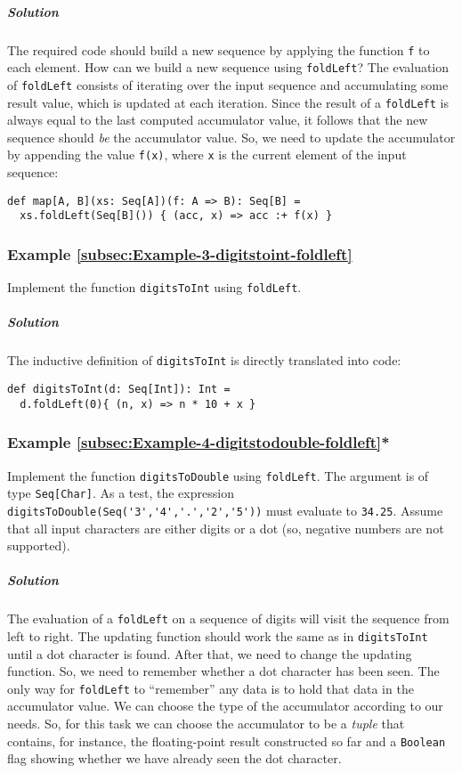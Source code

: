 \subparagraph{Solution}

The required code should build a new sequence by applying the function
\lstinline!f! to each element. How can we build a new sequence using
\lstinline!foldLeft!? The evaluation of \lstinline!foldLeft! consists
of iterating over the input sequence and accumulating some result
value, which is updated at each iteration. Since the result of a \lstinline!foldLeft!
is always equal to the last computed accumulator value, it follows
that the new sequence should \emph{be} the accumulator value. So,
we need to update the accumulator by appending the value \lstinline!f(x)!,
where \lstinline!x! is the current element of the input sequence:
\begin{lstlisting}
def map[A, B](xs: Seq[A])(f: A => B): Seq[B] =
  xs.foldLeft(Seq[B]()) { (acc, x) => acc :+ f(x) }
\end{lstlisting}


\subsubsection{Example \label{subsec:Example-3-digitstoint-foldleft}\ref{subsec:Example-3-digitstoint-foldleft}}

Implement the function \lstinline!digitsToInt! using \lstinline!foldLeft!.

\subparagraph{Solution}

The inductive definition of \lstinline!digitsToInt! is directly translated
into code:

\begin{lstlisting}
def digitsToInt(d: Seq[Int]): Int =
  d.foldLeft(0){ (n, x) => n * 10 + x }
\end{lstlisting}


\subsubsection{Example \label{subsec:Example-4-digitstodouble-foldleft}\ref{subsec:Example-4-digitstodouble-foldleft}{*}}

Implement the function \lstinline!digitsToDouble! using \lstinline!foldLeft!.
The argument is of type \lstinline!Seq[Char]!. As a test, the expression
\lstinline!digitsToDouble(Seq('3','4','.','2','5'))! must evaluate
to \lstinline!34.25!. Assume that all input characters are either
digits or a dot (so, negative numbers are not supported).

\subparagraph{Solution}

The evaluation of a \lstinline!foldLeft! on a sequence of digits
will visit the sequence from left to right. The updating function
should work the same as in \lstinline!digitsToInt! until a dot character
is found. After that, we need to change the updating function. So,
we need to remember whether a dot character has been seen. The only
way for \lstinline!foldLeft! to \textsf{``}remember\textsf{''} any data is to hold
that data in the accumulator value. We can choose the type of the
accumulator according to our needs. So, for this task we can choose
the accumulator to be a \emph{tuple} that contains, for instance,
the floating-point result constructed so far and a \lstinline!Boolean!
flag showing whether we have already seen the dot character.

